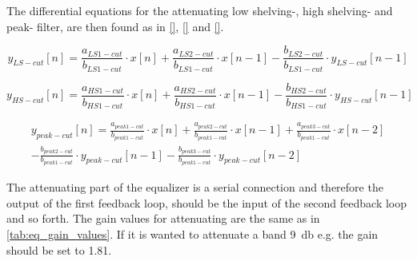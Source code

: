     \startexplain
    \stopexplain
    
The differential equations for the attenuating low shelving-, high shelving- and peak- filter, are then found as in \autoref{}, \autoref{} and \autoref{}.

\begin{equation}\label{eq:z_to_n_LS}
        y_{LS-cut}[n] = \frac{a_{LS1-cut}}{b_{LS1-cut}} \cdot x[n] + \frac{a_{LS2-cut}}{b_{LS1-cut}} \cdot x[n-1] -  \frac{b_{LS2-cut}}{b_{LS1-cut}} \cdot y_{LS-cut}[n-1]
    \end{equation}

\begin{equation}\label{eq:z_to_n_HS}
        y_{HS-cut}[n] = \frac{a_{HS1-cut}}{b_{HS1-cut}} \cdot x[n] + \frac{a_{HS2-cut}}{b_{HS1-cut}} \cdot x[n-1] -  \frac{b_{HS2-cut}}{b_{HS1-cut}} \cdot y_{HS-cut}[n-1]
    \end{equation}
    
\begin{equation}
\begin{aligned}
y_{peak-cut}[n] = \frac{a_{peak1-cut}}{b_{peak1-cut}} \cdot x[n] + \frac{a_{peak2-cut}}{b_{peak1-cut}} \cdot x[n-1]+ \frac{a_{peak3-cut}} {b_{peak1-cut}} \cdot x[n-2] \\
- \frac{b_{peak2-cut}}{b_{peak1-cut}} \cdot y_{peak-cut}[n-1] - \frac{b_{peak3-cut}}{b_{peak1-cut}} \cdot y_{peak-cut}[n-2]
\end{aligned}
\end{equation}

The attenuating part of the equalizer is a serial connection and therefore the output of the first feedback loop, should be the input of the second feedback loop and so forth.
The gain values for attenuating are the same as in \autoref{tab:eq_gain_values}. If it is wanted to attenuate a band \SI{9}{\decibel} e.g. the gain should be set to 1.81.

